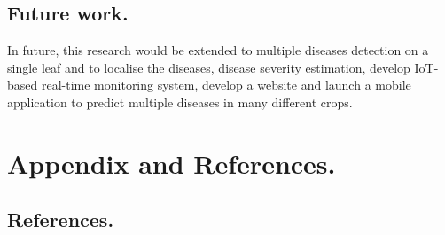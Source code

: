 \documentclass[11pt]{report}
\begin{document}
\section{Future work.}
In future, this research would be extended to multiple diseases detection on a single leaf
and to localise the diseases, disease severity estimation, develop
IoT-based real-time monitoring system, develop a website and launch a mobile application to predict multiple diseases in many different crops.\\



\newpage
\chapter{Appendix and References.}
\section{References.}
\end{document}
